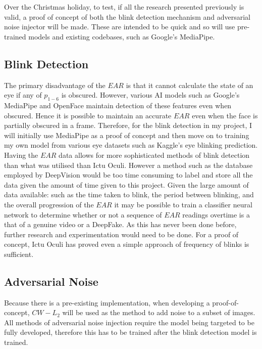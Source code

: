 \documentclass{article}
\begin{document}
Over the Christmas holiday, to test, if all the research presented previously is valid, a proof of concept of both the blink detection mechanism and adversarial noise injector will be made. These are intended to be quick and so will use pre-trained models and existing codebases, such as Google's MediaPipe. 

\subsection{Blink Detection} \label{sec:future-blink}

The primary disadvantage of the $EAR$ is that it cannot calculate the state of an eye if any of $p_{1-6}$ is obscured\cite{ictuoculi}. However, various AI models such as Google's MediaPipe \cite{mediapipe} and OpenFace\cite{openface} maintain detection of these features even when obscured. Hence it is possible to maintain an accurate $EAR$ even when the face is partially obscured in a frame. Therefore, for the blink detection in my project, I will initially use MediaPipe as a proof of concept and then move on to training my own model from various eye datasets such as Kaggle's eye blinking prediction\cite{eyeblinkprediction}.\\

Having the $EAR$ data allows for more sophisticated methods of blink detection than what was utilised than Ictu Oculi. However a method such as the database employed by DeepVision\cite{blinking-pattern} would be too time consuming to label and store all the data given the amount of time given to this project. Given the large amount of data available: such as the time taken to blink, the period between blinking, and the overall progression of the $EAR$ it may be possible to train a classifier neural network to determine whether or not a sequence of $EAR$ readings overtime is a that of a genuine video or a DeepFake. As this has never been done before, further research and experimentation would need to be done. For a proof of concept, Ictu Oculi has proved even a simple approach of frequency of blinks is sufficient\cite{ictuoculi}.

\subsection{Adversarial Noise} \label{sec:future-noise}

Because there is a pre-existing implementation\cite{cwl2python}, when developing a proof-of-concept, $CW-L_2$ will be used as the method to add noise to a subset of images. All methods of adversarial noise injection require the model being targeted to be fully developed, therefore this has to be trained after the blink detection model is trained.\\
\end{document}

